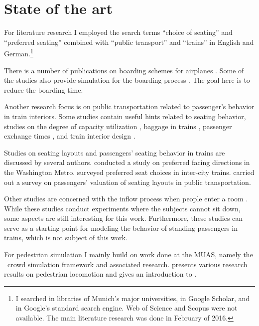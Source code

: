 \section{State of the art}

For literature research I employed the search terms ``choice of seating'' and
``preferred seating'' combined with ``public transport'' and ``trains'' in
English and German.\footnote{I searched in libraries of Munich's major
universities, in Google Scholar, and in Google's standard search
engine. Web of Science and Scopus were not available. The main literature research
was done in February of 2016.}

There is a number of publications on boarding schemes for
airplanes \citep{steiner-2009,jaehn-2015,qiang-2014}.
Some of the studies also provide simulation for the boarding
process \citep{steiner-2009,qiang-2014}.
The goal here is to reduce the boarding time.

Another research focus is on public transportation related to passenger's
behavior in train interiors.
Some studies contain useful hints related to seating behavior, \eg studies on
the degree of capacity utilization \citep{cis-2009}, baggage in
trains \citep{plank-2008}, passenger exchange
times \citep{tuna-2008,panzera-2014}, and train interior
design \citep{rueger-2015}.

Studies on seating layouts and passengers' seating behavior in trains are
discussed by several authors.
\citet{trinkoff-1985} conducted a study on preferred facing directions
in the Washington Metro.
\citet{rueger-2010} surveyed preferred seat choices in inter-city trains.
\citet{wardman-2015} carried out a survey on passengers' valuation of
seating layouts in public transportation.

Other studies are concerned with the inflow process when people enter a
room \citep{liu-2016,liu-2016b,xiao-2016,ezaki-2016}.
While these studies conduct experiments where the subjects cannot sit down, some
aspects are still interesting for this work.
Furthermore, these studies can serve as a starting point for modeling the
behavior of standing passengers in trains, which is not subject of this work.

For pedestrian simulation I mainly build on work done at the \acl{MUAS}, namely
the \vadere\ crowd simulation framework and associated research.
\citet{seitz-2016} presents various research results on pedestrian locomotion
and gives an introduction to \vadere.


